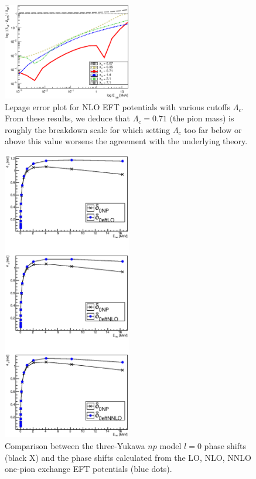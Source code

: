 \documentclass[10pt,showpacs,preprintnumbers,footinbib,amsmath,amssymb,aps,prl,twocolumn,groupedaddress,superscriptaddress,showkeys]{revtex4-1}
\begin{document}
\begin{figure}
\centering
	\includegraphics[width=0.5\textwidth]{figures/phy989_pionlessCutoff.eps}
	\caption{Lepage error plot for NLO EFT potentials with various cutoffs $\Lambda_c$.
	From these results, we deduce that $\Lambda_c = 0.71$ (the pion mass) is roughly
	the breakdown scale for which setting $\Lambda_c$ too far below or above this
	value worsens the agreement with the underlying theory.}
	\label{fig:LepageCutoff}
\end{figure}

\clearpage


\begin{figure}
\centering
	\includegraphics[width=0.5\textwidth]{figures/phy989_OnePion.eps}
	\caption{Comparison between the three-Yukawa $np$ model $l=0$ phase shifts
	(black X)
	and the phase shifts calculated from the LO, NLO, NNLO one-pion exchange
	EFT potentials (blue dots).}
	\label{fig:OnePion}
\end{figure}
\end{document}
